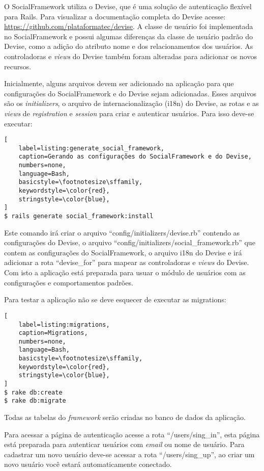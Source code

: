 O SocialFramework utiliza o Devise, que é uma solução de autenticação flexível para Rails. Para visualizar a documentação completa do Devise acesse: \url{https://github.com/plataformatec/devise}. A classe de usuário foi implementada no SocialFramework e possui algumas diferenças da classe de usuário padrão do Devise, como a adição do atributo nome e dos relacionamentos dos usuários. As controladoras e \textit{views} do Devise também foram alteradas para adicionar os novos recursos.

Inicialmente, alguns arquivos devem ser adicionado na aplicação para que configurações do SocialFramework e do Devise sejam adicionadas. Esses arquivos são os \textit{initializers}, o arquivo de internacionalização (i18n) do Devise, as rotas e as \textit{views} de \textit{registration} e \textit{session} para criar e autenticar usuários. Para isso deve-se executar:

\begin{lstlisting}[
    label=listing:generate_social_framework,
    caption=Gerando as configurações do SocialFramework e do Devise,
    numbers=none,
    language=Bash,
    basicstyle=\footnotesize\sffamily,
    keywordstyle=\color{red},
    stringstyle=\color{blue},
]
$ rails generate social_framework:install
\end{lstlisting}

Este comando irá criar o arquivo ``config/initializers/devise.rb'' contendo as configurações do Devise, o arquivo ``config/initializers/social\_framework.rb'' que contem as configurações do SocialFramework, o arquivo i18n do Devise e irá adicionar a rota ``devise\_for'' para mapear as controladoras e \textit{views} do Devise. Com isto a aplicação está preparada para usuar o módulo de usuários com as configurações e comportamentos padrões.

Para testar a aplicação não se deve esquecer de executar as migrations:

\begin{lstlisting}[
    label=listing:migrations,
    caption=Migrations,
    numbers=none,
    language=Bash,
    basicstyle=\footnotesize\sffamily,
    keywordstyle=\color{red},
    stringstyle=\color{blue},
]
$ rake db:create
$ rake db:migrate
\end{lstlisting}

Todas as tabelas do \textit{framework} serão criadas no banco de dados da aplicação.

Para acessar a página de autenticação acesse a rota ``/users/sing\_in'', esta página está preparada para autenticar usuários com \textit{email} ou nome de usuário. Para cadastrar um novo usuário deve-se acessar a rota ``/users/sing\_up'', ao criar um novo usuário você estará automaticamente conectado.

